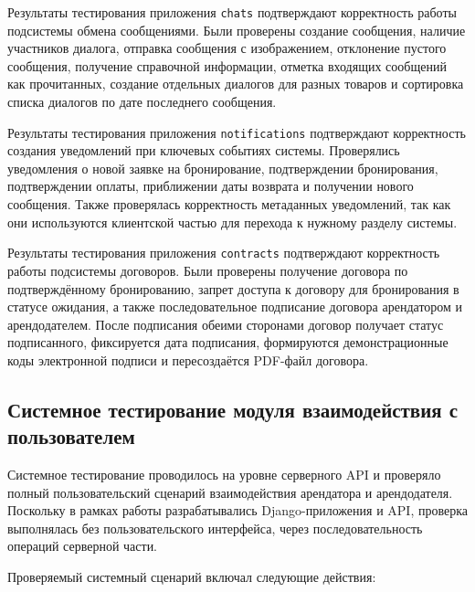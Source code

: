 Результаты тестирования приложения \texttt{chats} подтверждают корректность работы подсистемы обмена сообщениями. Были проверены создание сообщения, наличие участников диалога, отправка сообщения с изображением, отклонение пустого сообщения, получение справочной информации, отметка входящих сообщений как прочитанных, создание отдельных диалогов для разных товаров и сортировка списка диалогов по дате последнего сообщения.

Результаты тестирования приложения \texttt{notifications} подтверждают корректность создания уведомлений при ключевых событиях системы. Проверялись уведомления о новой заявке на бронирование, подтверждении бронирования, подтверждении оплаты, приближении даты возврата и получении нового сообщения. Также проверялась корректность метаданных уведомлений, так как они используются клиентской частью для перехода к нужному разделу системы.

Результаты тестирования приложения \texttt{contracts} подтверждают корректность работы подсистемы договоров. Были проверены получение договора по подтверждённому бронированию, запрет доступа к договору для бронирования в статусе ожидания, а также последовательное подписание договора арендатором и арендодателем. После подписания обеими сторонами договор получает статус подписанного, фиксируется дата подписания, формируются демонстрационные коды электронной подписи и пересоздаётся PDF-файл договора.

\subsection{Системное тестирование модуля взаимодействия с пользователем}

Системное тестирование проводилось на уровне серверного API и проверяло полный пользовательский сценарий взаимодействия арендатора и арендодателя. Поскольку в рамках работы разрабатывались Django-приложения и API, проверка выполнялась без пользовательского интерфейса, через последовательность операций серверной части.

Проверяемый системный сценарий включал следующие действия:

